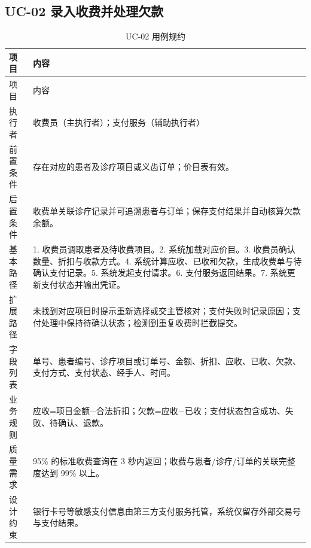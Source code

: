 \documentclass[UTF8,a4paper,12pt,fontset=fandol]{ctexart}
\begin{document}
\subsection{UC-02 录入收费并处理欠款}
\begin{longtable}{L{3.1cm}Z}
\caption{UC-02 用例规约}\label{tab:uc02}\\
\toprule 项目 & 内容 \\ \midrule
\endfirsthead
\toprule 项目 & 内容 \\ \midrule
\endhead
执行者 & 收费员（主执行者）；支付服务（辅助执行者） \\
前置条件 & 存在对应的患者及诊疗项目或义齿订单；价目表有效。 \\
后置条件 & 收费单关联诊疗记录并可追溯患者与订单；保存支付结果并自动核算欠款余额。 \\
基本路径 & 1. 收费员调取患者及待收费项目。2. 系统加载对应价目。3. 收费员确认数量、折扣与收款方式。4. 系统计算应收、已收和欠款，生成收费单与待确认支付记录。5. 系统发起支付请求。6. 支付服务返回结果。7. 系统更新支付状态并输出凭证。 \\
扩展路径 & 未找到对应项目时提示重新选择或交主管核对；支付失败时记录原因；支付处理中保持待确认状态；检测到重复收费时拦截提交。 \\
字段列表 & 单号、患者编号、诊疗项目或订单号、金额、折扣、应收、已收、欠款、支付方式、支付状态、经手人、时间。 \\
业务规则 & 应收=项目金额$-$合法折扣；欠款=应收$-$已收；支付状态包含成功、失败、待确认、退款。 \\
质量需求 & 95\% 的标准收费查询在 3 秒内返回；收费与患者/诊疗/订单的关联完整度达到 99\% 以上。 \\
设计约束 & 银行卡号等敏感支付信息由第三方支付服务托管，系统仅留存外部交易号与支付结果。 \\
\bottomrule
\end{longtable}

\end{document}

